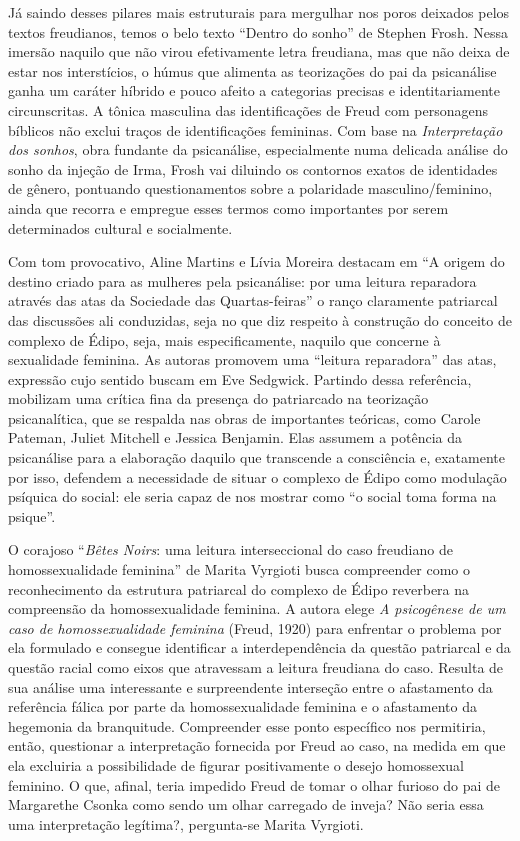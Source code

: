 Já saindo desses pilares mais estruturais para mergulhar nos poros
deixados pelos textos freudianos, temos o belo texto ``Dentro do sonho''
de Stephen Frosh. Nessa imersão naquilo que não virou efetivamente letra
freudiana, mas que não deixa de estar nos interstícios, o húmus que
alimenta as teorizações do pai da psicanálise ganha um caráter híbrido e
pouco afeito a categorias precisas e identitariamente circunscritas. A
tônica masculina das identificações de Freud com personagens bíblicos
não exclui traços de identificações femininas. Com base na
\emph{Interpretação dos sonhos}, obra fundante da psicanálise,
especialmente numa delicada análise do sonho da injeção de Irma, Frosh
vai diluindo os contornos exatos de identidades de gênero, pontuando
questionamentos sobre a polaridade masculino/feminino, ainda que recorra
e empregue esses termos como importantes por serem determinados cultural
e socialmente.

Com tom provocativo, Aline Martins e Lívia Moreira destacam em ``A
origem do destino criado para as mulheres pela psicanálise: por uma
leitura reparadora através das atas da Sociedade das Quartas-feiras'' o
ranço claramente patriarcal das discussões ali conduzidas, seja no que
diz respeito à construção do conceito de complexo de Édipo, seja, mais
especificamente, naquilo que concerne à sexualidade feminina. As autoras
promovem uma ``leitura reparadora'' das atas, expressão cujo sentido
buscam em Eve Sedgwick. Partindo dessa referência, mobilizam uma crítica
fina da presença do patriarcado na teorização psicanalítica, que se
respalda nas obras de importantes teóricas, como Carole Pateman, Juliet
Mitchell e Jessica Benjamin. Elas assumem a potência da psicanálise para
a elaboração daquilo que transcende a consciência e, exatamente por
isso, defendem a necessidade de situar o complexo de Édipo como
modulação psíquica do social: ele seria capaz de nos mostrar como ``o
social toma forma na psique''.

O corajoso ``\emph{Bêtes Noirs}: uma leitura interseccional do caso
freudiano de homossexualidade feminina'' de Marita Vyrgioti busca
compreender como o reconhecimento da estrutura patriarcal do complexo de
Édipo reverbera na compreensão da homossexualidade feminina. A autora
elege \emph{A psicogênese de um caso de homossexualidade feminina}
(Freud, 1920) para enfrentar o problema por ela formulado e consegue
identificar a interdependência da questão patriarcal e da questão racial
como eixos que atravessam a leitura freudiana do caso. Resulta de sua
análise uma interessante e surpreendente interseção entre o afastamento
da referência fálica por parte da homossexualidade feminina e o
afastamento da hegemonia da branquitude. Compreender esse ponto
específico nos permitiria, então, questionar a interpretação fornecida
por Freud ao caso, na medida em que ela excluiria a possibilidade de
figurar positivamente o desejo homossexual feminino. O que, afinal,
teria impedido Freud de tomar o olhar furioso do pai de Margarethe
Csonka como sendo um olhar carregado de inveja? Não seria essa uma
interpretação legítima?, pergunta-se Marita Vyrgioti.


